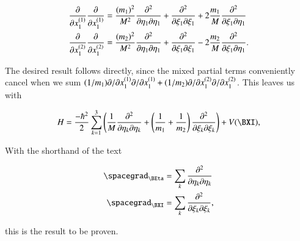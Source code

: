\begin{align}\label{eqn:bohm15:pr2:3}
\frac{\partial {}}{\partial {x_1^{(1)}}} \frac{\partial {}}{\partial {x_1^{(1)}}}
&=
\frac{(m_1)^2}{M^2} \frac{\partial^2}{\partial \eta_1 \partial \eta_1}{}
+\frac{\partial^2}{\partial \xi_1 \partial \xi_1}{}
+2 \frac{m_1}{M} \frac{\partial^2}{\partial \xi_1 \partial \eta_1}{} \\
\frac{\partial {}}{\partial {x_1^{(2)}}} \frac{\partial {}}{\partial {x_1^{(2)}}}
&=
\frac{(m_2)^2}{M^2} \frac{\partial^2}{\partial \eta_1 \partial \eta_1}{}
+\frac{\partial^2}{\partial \xi_1 \partial \xi_1}{}
-2 \frac{m_2}{M} \frac{\partial^2}{\partial \xi_1 \partial \eta_1}{}.
\end{align}

The desired result follows directly, since the mixed partial terms conveniently cancel when we sum $(1/m_1) {\partial {}}/{\partial {x_1^{(1)}}} {\partial {}}/{\partial {x_1^{(1)}}} +(1/m_2) {\partial {}}/{\partial {x_1^{(2)}}} {\partial {}}/{\partial {x_1^{(2)}}}$.  This leaves us with

\begin{align}\label{eqn:bohm15:pr2:4}
H = 
\frac{-\hbar^2}{2} \sum_{k=1}^3 \left( 
\inv{M} \frac{\partial^2}{\partial \eta_k \partial \eta_k}{}
+ \left( \inv{m_1} + \inv{m_2} \right) \frac{\partial^2}{\partial \xi_k \partial \xi_k}{}
\right)
+ V(\BXI),
\end{align}

With the shorthand of the text

\begin{align}\label{eqn:bohm15:pr2:5}
\spacegrad_{\BEta} &= \sum_k \frac{\partial^2}{\partial \eta_k \partial \eta_k}{} \\
\spacegrad_{\BXI} &= \sum_k \frac{\partial^2}{\partial \xi_k \partial \xi_k}{},
\end{align}

this is the result to be proven.

\EndArticle
